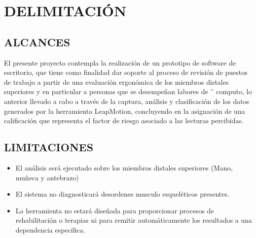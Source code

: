 \chapter{DELIMITACIÓN}
\section{ALCANCES}
El presente proyecto contempla la realización de un prototipo de software de escritorio, que tiene como finalidad dar soporte al proceso de revisión de puestos de trabajo a partir de una evaluación ergonómica de los miembros distales superiores y en particular a personas que se desempeñan labores de ˜
computo, lo anterior llevado a cabo a través de la captura, análisis y clasificación de los datos generados por la herramienta LeapMotion, concluyendo en la asignación de una calificación que representa el factor de riesgo asociado a las lecturas percibidas.

\section{LIMITACIONES}
\begin{itemize}
\item El análisis será ejecutado sobre los miembros distales superiores (Mano, muñeca y antebrazo)
\item El sistema no diagnosticará desordenes musculo esqueléticos presentes.
\item La herramienta no estará diseñada para proporcionar procesos de rehabilitación o terapias ni para remitir automáticamente los resultados a una dependencia específica.
\end{itemize}